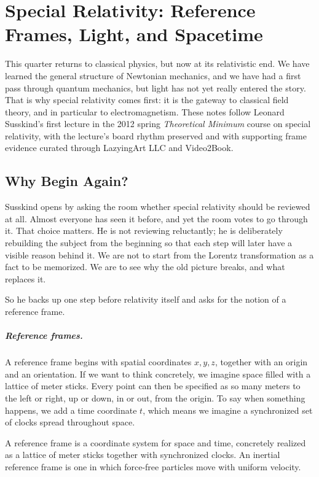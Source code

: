 \chapter{Special Relativity: Reference Frames, Light, and Spacetime}

This quarter returns to classical physics, but now at its relativistic end. We have learned the general structure of Newtonian mechanics, and we have had a first pass through quantum mechanics, but light has not yet really entered the story. That is why special relativity comes first: it is the gateway to classical field theory, and in particular to electromagnetism. These notes follow Leonard Susskind's first lecture in the 2012 spring \emph{Theoretical Minimum} course on special relativity, with the lecture's board rhythm preserved and with supporting frame evidence curated through LazyingArt LLC and Video2Book.

\section{Why Begin Again?}

Susskind opens by asking the room whether special relativity should be reviewed at all. Almost everyone has seen it before, and yet the room votes to go through it. That choice matters. He is not reviewing reluctantly; he is deliberately rebuilding the subject from the beginning so that each step will later have a visible reason behind it. We are not to start from the Lorentz transformation as a fact to be memorized. We are to see why the old picture breaks, and what replaces it.

So he backs up one step before relativity itself and asks for the notion of a reference frame.

\paragraph{Reference frames.}
A reference frame begins with spatial coordinates \(x,y,z\), together with an origin and an orientation. If we want to think concretely, we imagine space filled with a lattice of meter sticks. Every point can then be specified as so many meters to the left or right, up or down, in or out, from the origin. To say when something happens, we add a time coordinate \(t\), which means we imagine a synchronized set of clocks spread throughout space.

\begin{definition}
A reference frame is a coordinate system for space and time, concretely realized as a lattice of meter sticks together with synchronized clocks. An inertial reference frame is one in which force-free particles move with uniform velocity.
\end{definition}

